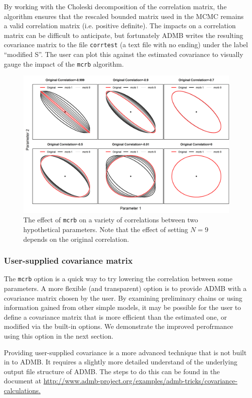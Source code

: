 \documentclass{article}\usepackage[]{graphicx}\usepackage[]{color}
\begin{document}
By working with the Choleski decomposition of the
correlation matrix, the algorithm ensures that the rescaled
bounded matrix used in the MCMC remains a valid correlation
matrix (i.e. positive definite). The impacts on a
correlation matrix can be difficult to anticipate, but
fortunately ADMB writes the resulting covariance matrix to
the file \texttt{corrtest} (a text file with no ending)
under the label ``modified S''. The user can plot this
against the estimated covariance to visually gauge the
impact of the \texttt{mcrb} algorithm.

\begin{figure}[h]
  \centering
  \includegraphics[width=5in]{../plots/mcrb_examples.png}
  \caption{The effect of \texttt{mcrb} on a variety of
    correlations between two hypothetical parameters. Note
    that the effect of setting $N=9$ depends on the original
    correlation.}
  \label{fig:mcrb}
\end{figure}

\subsubsection{User-supplied covariance matrix}\label{sec:user.cov}
The \texttt{mcrb} option is a quick way to try lowering the
correlation between some parameters. A more flexible (and
transparent) option is to provide ADMB with a covariance
matrix chosen by the user. By examining preliminary chains
or using information gained from other simple models, it may
be possible for the user to define a covariance matrix that
is more efficient than the estimated one, or modified via
the built-in options. We demonstrate the improved
perofrmance using this option in the next section.

Providing user-supplied covariance is a more advanced
technique that is not built in to ADMB. It requires a
slightly more detailed understand of the underlying output
file structure of ADMB. The steps to do this can be found in
the document at
\url{http://www.admb-project.org/examples/admb-tricks/covariance-calculations.}
\end{document}

